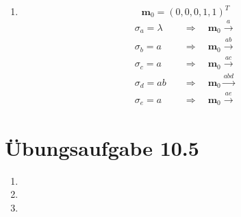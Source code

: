 \documentclass[a4paper]{scrartcl}
\begin{document}
\begin{enumerate}
    \item
        \begin{equation}
            \textbf{m}_0 = \left( 0, 0, 0, 1, 1 \right)^T
        \end{equation}
        \begin{equation}
            \begin{split}
                \sigma_a = \lambda \quad &\Rightarrow \quad 
                \textbf{m}_0 \stackrel{a}{\longrightarrow} \\
                \sigma_b = a \quad &\Rightarrow \quad 
                \textbf{m}_0 \stackrel{ab}{\longrightarrow} \\
                \sigma_c = a \quad &\Rightarrow \quad 
                \textbf{m}_0 \stackrel{ac}{\longrightarrow} \\
                \sigma_d = ab \quad &\Rightarrow \quad 
                \textbf{m}_0 \stackrel{abd}{\longrightarrow} \\
                \sigma_e = a \quad &\Rightarrow \quad 
                \textbf{m}_0 \stackrel{ae}{\longrightarrow}
            \end{split}
        \end{equation}
        
\end{enumerate}

\section*{Übungsaufgabe 10.5} 
\begin{enumerate}
    \item

    \item

    \item

\end{enumerate}
\end{document}
